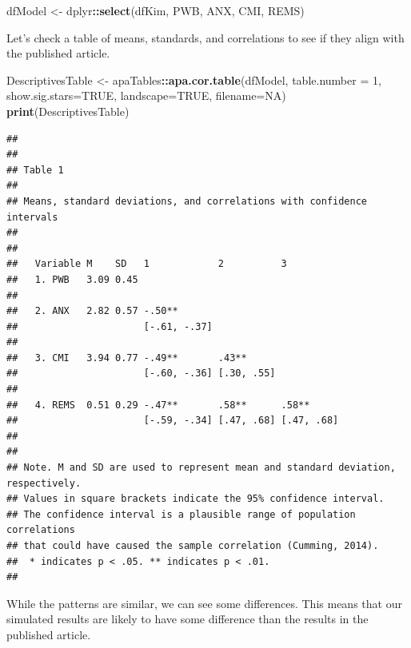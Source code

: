 \documentclass[
  11pt,
]{book}
\newenvironment{Shaded}{\begin{snugshade}}{\end{snugshade}}
\newcommand{\AttributeTok}[1]{\textcolor[rgb]{0.27,0.27,0.27}{#1}}
\newcommand{\ConstantTok}[1]{\textcolor[rgb]{0.37,0.37,0.37}{#1}}
\newcommand{\DecValTok}[1]{\textcolor[rgb]{0.06,0.06,0.06}{#1}}
\newcommand{\FunctionTok}[1]{\textcolor[rgb]{0.27,0.27,0.27}{\textbf{#1}}}
\newcommand{\NormalTok}[1]{#1}
\newcommand{\OtherTok}[1]{\textcolor[rgb]{0.37,0.37,0.37}{#1}}
\newcommand{\SpecialCharTok}[1]{\textcolor[rgb]{0.43,0.43,0.43}{\textbf{#1}}}
\begin{document}
\begin{Shaded}
\begin{Highlighting}[]
\NormalTok{dfModel }\OtherTok{\textless{}{-}}\NormalTok{ dplyr}\SpecialCharTok{::}\FunctionTok{select}\NormalTok{(dfKim, PWB, ANX, CMI, REMS)}
\end{Highlighting}
\end{Shaded}

Let's check a table of means, standards, and correlations to see if they align with the published article.

\begin{Shaded}
\begin{Highlighting}[]
\NormalTok{DescriptivesTable }\OtherTok{\textless{}{-}}\NormalTok{ apaTables}\SpecialCharTok{::}\FunctionTok{apa.cor.table}\NormalTok{(dfModel, }\AttributeTok{table.number =} \DecValTok{1}\NormalTok{, }\AttributeTok{show.sig.stars=}\ConstantTok{TRUE}\NormalTok{, }\AttributeTok{landscape=}\ConstantTok{TRUE}\NormalTok{, }\AttributeTok{filename=}\ConstantTok{NA}\NormalTok{)}
\FunctionTok{print}\NormalTok{(DescriptivesTable)}
\end{Highlighting}
\end{Shaded}

\begin{verbatim}
## 
## 
## Table 1 
## 
## Means, standard deviations, and correlations with confidence intervals
##  
## 
##   Variable M    SD   1            2          3         
##   1. PWB   3.09 0.45                                   
##                                                        
##   2. ANX   2.82 0.57 -.50**                            
##                      [-.61, -.37]                      
##                                                        
##   3. CMI   3.94 0.77 -.49**       .43**                
##                      [-.60, -.36] [.30, .55]           
##                                                        
##   4. REMS  0.51 0.29 -.47**       .58**      .58**     
##                      [-.59, -.34] [.47, .68] [.47, .68]
##                                                        
## 
## Note. M and SD are used to represent mean and standard deviation, respectively.
## Values in square brackets indicate the 95% confidence interval.
## The confidence interval is a plausible range of population correlations 
## that could have caused the sample correlation (Cumming, 2014).
##  * indicates p < .05. ** indicates p < .01.
## 
\end{verbatim}

While the patterns are similar, we can see some differences. This means that our simulated results are likely to have some difference than the results in the published article.
\end{document}
